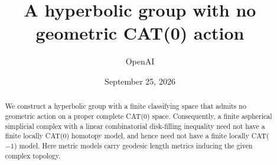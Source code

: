 \documentclass[11pt]{article}
\title{A hyperbolic group with no geometric CAT(0) action}
\author{OpenAI}
\date{September 25, 2026}
\begin{document}
\maketitle
\begin{abstract}
We construct a hyperbolic group with a finite classifying space that admits no geometric action on a proper complete CAT(0) space. Consequently, a finite aspherical simplicial complex with a linear combinatorial disk-filling inequality need not have a finite locally CAT(0) homotopy model, and hence need not have a finite locally CAT($-1$) model. Here metric models carry geodesic length metrics inducing the given complex topology.
\end{abstract}
\setcounter{tocdepth}{1}
\tableofcontents
\clearpage









\end{document}
